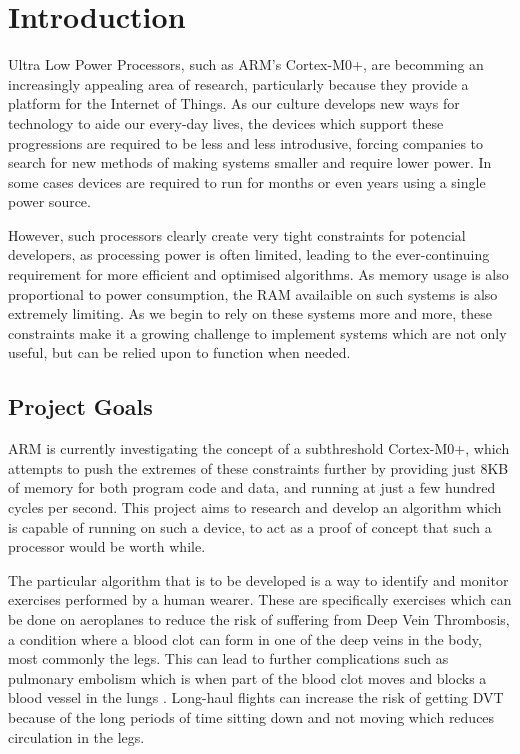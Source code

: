 \chapter{Introduction}

Ultra Low Power Processors, such as ARM's Cortex-M0+, are becomming an increasingly appealing area of research, particularly because they provide a platform for the Internet of Things. As our culture develops new ways for technology to aide our every-day lives, the devices which support these progressions are required to be less and less introdusive, forcing companies to search for new methods of making systems smaller and require lower power. In some cases devices are required to run for months or even years using a single power source.

However, such processors clearly create very tight constraints for potencial developers, as processing power is often limited, leading to the ever-continuing requirement for more efficient and optimised algorithms. As memory usage is also proportional to power consumption, the RAM availaible on such systems is also extremely limiting. As we begin to rely on these systems more and more, these constraints make it a growing challenge to implement systems which are not only useful, but can be relied upon to function when needed.

\section{Project Goals}

ARM is currently investigating the concept of a subthreshold Cortex-M0+, which attempts to push the extremes of these constraints further by providing just 8KB of memory for both program code and data, and running at just a few hundred cycles per second. This project aims to research and develop an algorithm which is capable of running on such a device, to act as a proof of concept that such a processor would be worth while.

The particular algorithm that is to be developed is a way to identify and monitor exercises performed by a human wearer. These are specifically exercises which can be done on aeroplanes to reduce the risk of suffering from Deep Vein Thrombosis, a condition where a blood clot can form in one of the deep veins in the body, most commonly the legs. This can lead to further complications such as pulmonary embolism which is when part of the blood clot moves and blocks a blood vessel in the lungs \cite{NHS2014DVT}. Long-haul flights can increase the risk of getting DVT because of the long periods of time sitting down and not moving which reduces circulation in the legs.

